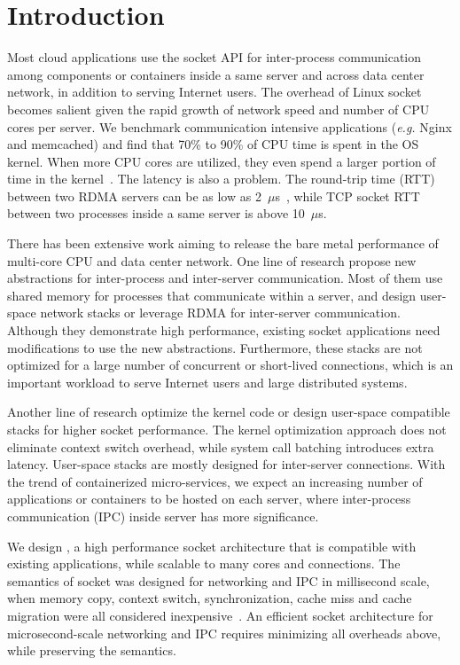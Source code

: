 \section{Introduction}
\label{sec:intro}

Most cloud applications use the socket API for inter-process communication among components or containers inside a same server and across data center network, in addition to serving Internet users. The overhead of Linux socket becomes salient given the rapid growth of network speed and number of CPU cores per server. We benchmark communication intensive applications (\textit{e.g.} Nginx and memcached) and find that 70\% to 90\% of CPU time is spent in the OS kernel. When more CPU cores are utilized, they even spend a larger portion of time in the kernel~\cite{boyd2010analysis}. The latency is also a problem. The round-trip time (RTT) between two RDMA servers can be as low as 2~$\mu$s~\cite{kaminsky2016design}, while TCP socket RTT between two processes inside a same server is above 10~$\mu$s.

There has been extensive work aiming to release the bare metal performance of multi-core CPU and data center network. One line of research propose new abstractions for inter-process and inter-server communication. Most of them use shared memory for processes that communicate within a server, and design user-space network stacks or leverage RDMA for inter-server communication. Although they demonstrate high performance, existing socket applications need modifications to use the new abstractions. Furthermore, these stacks are not optimized for a large number of concurrent or short-lived connections, which is an important workload to serve Internet users and large distributed systems.

Another line of research optimize the kernel code or design user-space compatible stacks for higher socket performance. The kernel optimization approach does not eliminate context switch overhead, while system call batching introduces extra latency. User-space stacks are mostly designed for inter-server connections. With the trend of containerized micro-services, we expect an increasing number of applications or containers to be hosted on each server, where inter-process communication (IPC) inside server has more significance.

We design \sys{}, a high performance socket architecture that is compatible with existing applications, while scalable to many cores and connections. The semantics of socket was designed for networking and IPC in millisecond scale, when memory copy, context switch, synchronization, cache miss and cache migration were all considered inexpensive~\cite{barroso2017attack}. An efficient socket architecture for microsecond-scale networking and IPC requires minimizing all overheads above, while preserving the semantics.

